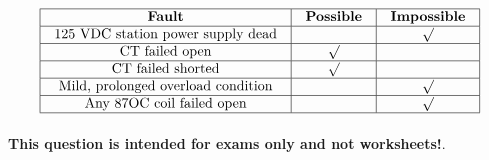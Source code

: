 






$$\vbox{\offinterlineskip
\halign{\strut
\vrule \quad\hfil # \ \hfil & 
\vrule \quad\hfil # \ \hfil & 
\vrule \quad\hfil # \ \hfil \vrule \cr
\noalign{\hrule}
%
{\bf Fault} & {\bf Possible} & {\bf Impossible} \cr
%
\noalign{\hrule}
%
125 VDC station power supply dead &  & $\surd$ \cr
%
\noalign{\hrule}
%
CT failed open & $\surd$ &  \cr
%
\noalign{\hrule}
%
CT failed shorted & $\surd$ &  \cr
%
\noalign{\hrule}
%
Mild, prolonged overload condition &  & $\surd$ \cr
%
\noalign{\hrule}
%
Any 87OC coil failed open &  & $\surd$ \cr
%
\noalign{\hrule}
} %
}$$ %







{\bf This question is intended for exams only and not worksheets!}.



